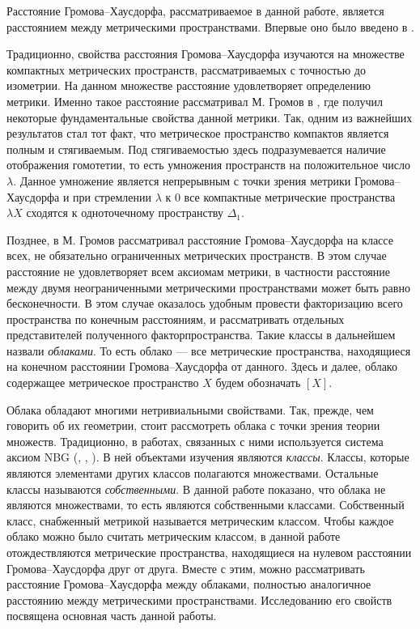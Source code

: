 Расстояние Громова--Хаусдорфа, рассматриваемое в данной работе,
является расстоянием
между метрическими пространствами. Впервые оно было введено в \cite{Edwards}.

Традиционно, свойства расстояния
Громова--Хаусдорфа
изучаются на множестве компактных метрических пространств,
рассматриваемых с точностью до изометрии. На данном множестве
расстояние удовлетворяет определению метрики. Именно такое расстояние
рассматривал М. Громов в \cite{gromov_structures_1981}, где получил
некоторые фундаментальные свойства данной метрики. Так, одним из
важнейших результатов стал тот факт, что метрическое пространство
компактов является полным и стягиваемым. Под стягиваемостью здесь
подразумевается наличие отображения гомотетии, то есть умножения
пространств на положительное число \( \lambda  \). Данное умножение
является непрерывным с точки зрения метрики Громова--Хаусдорфа и при
стремлении \( \lambda  \) к \( 0 \) все компактные метрические
пространства \( \lambda X \) сходятся к одноточечному пространству \(
\Delta _1 \).

Позднее, в \cite{gromov_metric_2001} М. Громов рассматривал
расстояние Громова--Хаусдорфа на классе всех, не обязательно
ограниченных метрических пространств. В этом случае расстояние не
удовлетворяет всем аксиомам метрики, в частности расстояние между
двумя неограниченными метрическими пространствами может быть равно
бесконечности. В этом случае оказалось удобным провести факторизацию
всего пространства по конечным расстояниям, и рассматривать отдельных
представителей полученного факторпространства. Такие классы в
дальнейшем назвали \emph{облаками}. То есть облако --- все
метрические пространства, находящиеся на конечном расстоянии
Громова--Хаусдорфа от данного. Здесь и далее, облако содержащее
метрическое пространство \( X \) будем обозначать \( [X] \).

Облака обладают многими нетривиальными свойствами. Так, прежде, чем
говорить об их геометрии, стоит рассмотреть облака с точки зрения
теории множеств. Традиционно, в работах, связанных с ними
используется система аксиом NBG (\cite{bernays_system_1937},
\cite{godel_consistency_1940}, \cite{neumann_1925}). В ней
объектами изучения являются \emph{классы}. Классы, которые являются
элементами других классов полагаются множествами. Остальные классы
называются \emph{собственными}. В данной работе показано, что облака
не являются множествами, то есть являются собственными классами.
Собственный класс, снабженный метрикой называется метрическим
классом. Чтобы каждое облако можно было считать метрическим классом,
в данной работе отождествляются метрические пространства, находящиеся
на нулевом расстоянии Громова--Хаусдорфа друг от друга. Вместе с
этим, можно рассматривать расстояние Громова--Хаусдорфа между
облаками, полностью аналогичное расстоянию между метрическими
пространствами. Исследованию его свойств посвящена основная часть данной работы.

